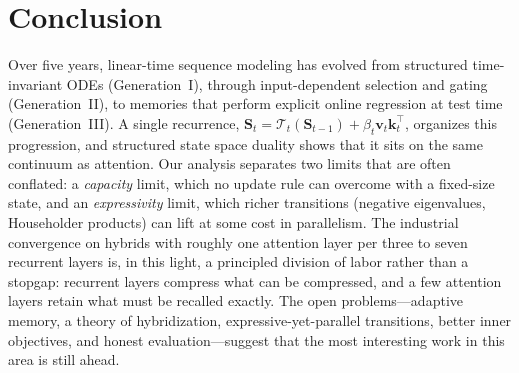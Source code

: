 \documentclass[a4paper]{article}
\newcommand{\T}{^{\top}}
\newcommand{\vk}{\mathbf{k}}
\newcommand{\vv}{\mathbf{v}}
\newcommand{\mS}{\mathbf{S}}
\theoremstyle{plain}
\theoremstyle{remark}
\begin{document}
\section{Conclusion}
\label{sec:conclusion}
Over five years, linear-time sequence modeling has evolved from structured time-invariant ODEs (Generation~I), through input-dependent selection and gating (Generation~II), to memories that perform explicit online regression at test time (Generation~III). A single recurrence, $\mS_t=\mathcal{T}_t(\mS_{t-1})+\beta_t\vv_t\vk_t\T$, organizes this progression, and structured state space duality shows that it sits on the same continuum as attention. Our analysis separates two limits that are often conflated: a \emph{capacity} limit, which no update rule can overcome with a fixed-size state, and an \emph{expressivity} limit, which richer transitions (negative eigenvalues, Householder products) can lift at some cost in parallelism. The industrial convergence on hybrids with roughly one attention layer per three to seven recurrent layers is, in this light, a principled division of labor rather than a stopgap: recurrent layers compress what can be compressed, and a few attention layers retain what must be recalled exactly. The open problems---adaptive memory, a theory of hybridization, expressive-yet-parallel transitions, better inner objectives, and honest evaluation---suggest that the most interesting work in this area is still ahead.

\clearpage


\end{document}
